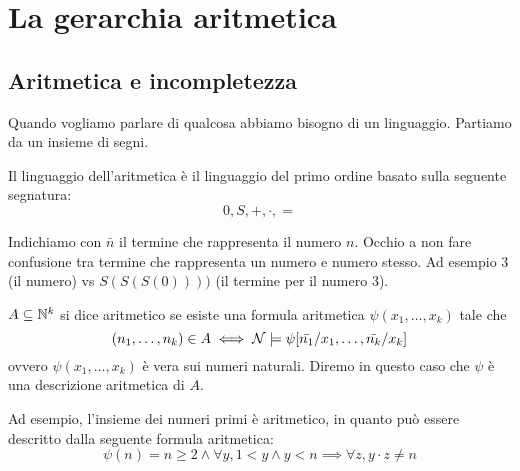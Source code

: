 %
%
%
%
\chapter{La gerarchia aritmetica}

\section{Aritmetica e incompletezza}

Quando vogliamo parlare di qualcosa abbiamo bisogno di un linguaggio. Partiamo da un insieme di
segni.

Il linguaggio dell'aritmetica è il linguaggio del primo ordine basato sulla
seguente segnatura:
\begin{equation*}
    0,S,+,\cdot,=
\end{equation*}

Indichiamo con $\bar{n}$ il termine che rappresenta il numero $n$. Occhio a non fare confusione tra
termine che rappresenta un numero e numero stesso. Ad esempio 3 (il numero) vs $S(S(S(0))))$ (il
termine per il numero 3).

\begin{defn}
    $A \subseteq \mathbb{N}^{k}$ si dice aritmetico se esiste una formula aritmetica
    $\psi(x_{1},\dotsc,x_{k})$ tale che
    \begin{equation*}
        (n_{1},\dotsc,n_{k}) \in A \iff \mathcal{N} \models \psi[\bar{n_{1}}/x_{1},\dotsc,\bar{n_{k}}/x_{k}]
    \end{equation*}
    ovvero $\psi(x_{1},\dotsc,x_{k})$ è vera sui numeri naturali. Diremo in questo caso che $\psi$ è una
    descrizione aritmetica di $A$.
\end{defn}

Ad esempio, l'insieme dei numeri primi è aritmetico, in quanto può essere
descritto dalla seguente formula aritmetica:
\begin{equation*}
    \psi(n) = n \geq 2 \land \forall y, 1 < y \land y < n \implies \forall z, y \cdot z \not= n
\end{equation*}

